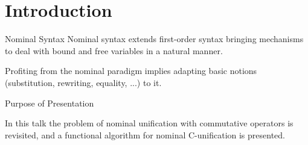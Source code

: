 \section{Introduction}

\begin{frame}{Nominal Syntax}
    Nominal syntax extends first-order syntax bringing mechanisms to deal with bound
    and free variables in a natural manner.
    \par Profiting from the nominal paradigm implies adapting basic notions 
    (substitution, rewriting, equality, ...) to it.
\end{frame}

\begin{frame}{Purpose of Presentation}
    \par In this talk the problem of nominal unification with commutative operators
    is revisited, and a functional algorithm for nominal C-unification is presented. 
\end{frame}

